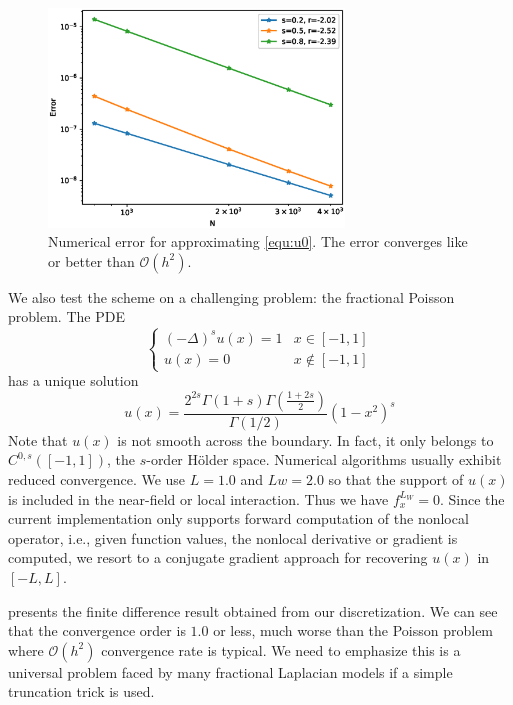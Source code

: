 \documentclass[3p,,preprint,12pt]{elsarticle}
\theoremstyle{definition}
\begin{document}
\begin{figure}[H] %
\centering
\includegraphics[width=0.7\textwidth,keepaspectratio]{figures/fig5}
\caption{Numerical error for approximating \cref{equ:u0}. The error converges like or better than $\mathcal{O}(h^2)$.}
\label{fig:fig5}
\end{figure}

We also test the scheme on a challenging problem: the fractional Poisson problem. The PDE
\begin{equation}
	\begin{cases}
		(-\Delta)^s u(x) = 1 & x\in [-1,1]\\
		u(x) = 0 & x\not\in [-1,1]
	\end{cases}
\end{equation}
has a unique solution
\begin{equation}
	u(x) = \frac{2^{2s}\Gamma(1+s)\Gamma\left( \frac{1+2s}{2} \right) }{\Gamma(1/2)} (1-x^2)^s
\end{equation}
Note that $u(x)$ is not smooth across the boundary. In fact, it only belongs to $C^{0,s}([-1,1])$, the $s$-order H\"older space. Numerical algorithms usually exhibit reduced convergence.  We use $L=1.0$ and $Lw=2.0$ so that the support of $u(x)$ is included in the near-field or local interaction. Thus we have $f_x^{L_W}=0$. Since the current implementation only supports forward computation of the nonlocal operator, i.e., given function values, the nonlocal derivative or gradient is computed, we resort to a conjugate gradient approach for recovering $u(x)$ in $[-L,L]$. 

 presents the finite difference result obtained from our discretization. We can see that the convergence order is $1.0$ or less, much worse than the Poisson problem where $\mathcal{O}(h^2)$ convergence rate is typical. We need to emphasize this is a universal problem faced by many fractional Laplacian models if a simple truncation trick is used. 
\end{document}
